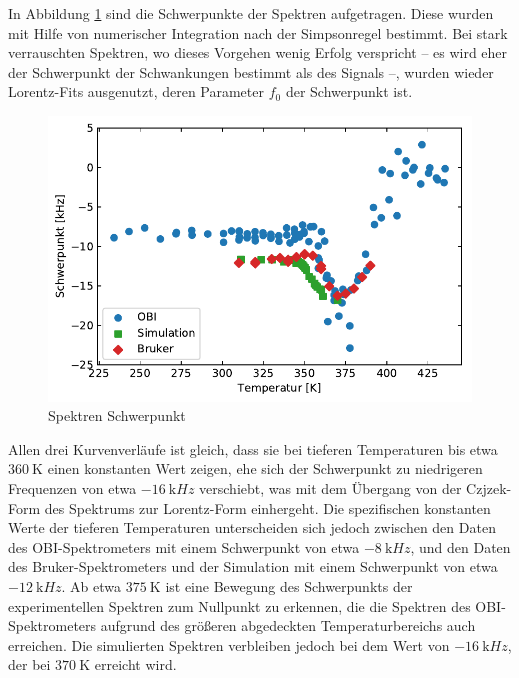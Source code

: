 In Abbildung \ref{fig:res:spek_mean} sind die Schwerpunkte der Spektren aufgetragen. Diese wurden mit Hilfe von numerischer Integration nach der Simpsonregel bestimmt. Bei stark verrauschten Spektren, wo dieses Vorgehen wenig Erfolg verspricht -- es wird eher der Schwerpunkt der Schwankungen bestimmt als des Signals --, wurden wieder Lorentz-Fits ausgenutzt, deren Parameter $f_0$ der Schwerpunkt ist.
\begin{figure}
	\begin{center}
		\includegraphics[width=.9\textwidth]{graphics/plot/mean.pdf} 
	\end{center}
	\caption{Spektren Schwerpunkt} \label{fig:res:spek_mean}
\end{figure}

Allen drei Kurvenverläufe ist gleich, dass sie bei tieferen Temperaturen bis etwa $\SI{360}{\kelvin}$ einen konstanten Wert zeigen, ehe sich der Schwerpunkt zu niedrigeren Frequenzen von etwa $\SI{-16}{\kilo Hz}$ verschiebt, was mit dem Übergang von der Czjzek-Form des Spektrums zur Lorentz-Form einhergeht. Die spezifischen konstanten Werte der tieferen Temperaturen unterscheiden sich jedoch zwischen den Daten des OBI-Spektrometers mit einem Schwerpunkt von etwa $\SI{-8}{\kilo Hz}$, und den Daten des Bruker-Spektrometers und der Simulation mit einem Schwerpunkt von etwa $\SI{-12}{\kilo Hz}$. Ab etwa $\SI{375}{\kelvin}$ ist eine Bewegung des Schwerpunkts der experimentellen Spektren zum Nullpunkt zu erkennen, die die Spektren des OBI-Spektrometers aufgrund des größeren abgedeckten Temperaturbereichs auch erreichen. Die simulierten Spektren verbleiben jedoch bei dem Wert von $\SI{-16}{\kilo Hz}$, der bei $\SI{370}{\kelvin}$ erreicht wird.


